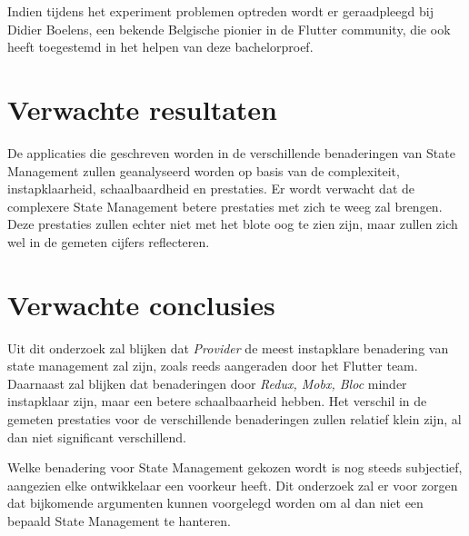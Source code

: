 Indien tijdens het experiment problemen optreden wordt er geraadpleegd bij Didier Boelens,
een bekende Belgische pionier in de Flutter community, die ook heeft toegestemd in het helpen van deze bachelorproef.

%

\section{Verwachte resultaten}
\label{sec:verwachte_resultaten}

De applicaties die geschreven worden in de verschillende benaderingen van State Management zullen
geanalyseerd worden op basis van de complexiteit, instapklaarheid, schaalbaardheid en prestaties.
Er wordt verwacht dat de complexere State Management betere prestaties met zich te weeg zal brengen.
Deze prestaties zullen echter niet met het blote oog te zien zijn, maar zullen zich wel in de 
gemeten cijfers reflecteren.


\section{Verwachte conclusies}
\label{sec:verwachte_conclusies}
Uit dit onderzoek zal blijken dat \emph{Provider} de meest instapklare benadering van state management
zal zijn, zoals reeds aangeraden door het Flutter team.
Daarnaast zal blijken dat benaderingen door \emph{Redux, Mobx, Bloc} minder instapklaar zijn, maar een 
betere schaalbaarheid hebben.
Het verschil in de gemeten prestaties voor de verschillende benaderingen zullen relatief klein zijn, al dan niet significant verschillend.

Welke benadering voor State Management gekozen wordt is nog steeds subjectief, aangezien elke ontwikkelaar een voorkeur heeft. Dit onderzoek zal er voor zorgen
dat bijkomende argumenten kunnen voorgelegd worden om al dan niet een bepaald State Management te hanteren.



